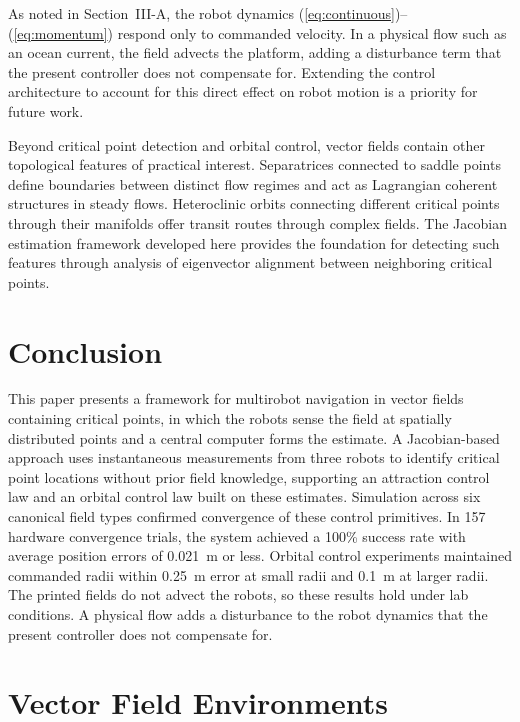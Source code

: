 \documentclass[lettersize,journal]{IEEEtran}
\begin{document}
As noted in Section~III-A, the robot dynamics (\ref{eq:continuous})--(\ref{eq:momentum}) respond only to commanded velocity. In a physical flow such as an ocean current, the field advects the platform, adding a disturbance term that the present controller does not compensate for. Extending the control architecture to account for this direct effect on robot motion is a priority for future work.

Beyond critical point detection and orbital control, vector fields contain other topological features of practical interest. Separatrices connected to saddle points define boundaries between distinct flow regimes and act as Lagrangian coherent structures in steady flows. Heteroclinic orbits connecting different critical points through their manifolds offer transit routes through complex fields. The Jacobian estimation framework developed here provides the foundation for detecting such features through analysis of eigenvector alignment between neighboring critical points.



\section{Conclusion}
\noindent

This paper presents a framework for multirobot navigation in vector fields containing critical points, in which the robots sense the field at spatially distributed points and a central computer forms the estimate. A Jacobian-based approach uses instantaneous measurements from three robots to identify critical point locations without prior field knowledge, supporting an attraction control law and an orbital control law built on these estimates. Simulation across six canonical field types confirmed convergence of these control primitives. In 157 hardware convergence trials, the system achieved a 100\% success rate with average position errors of 0.021~m or less. Orbital control experiments maintained commanded radii within 0.25~m error at small radii and 0.1~m at larger radii. The printed fields do not advect the robots, so these results hold under lab conditions. A physical flow adds a disturbance to the robot dynamics that the present controller does not compensate for.


\appendices

\section{Vector Field Environments}
\label{sec:appendix_vector_fields}
\end{document}

